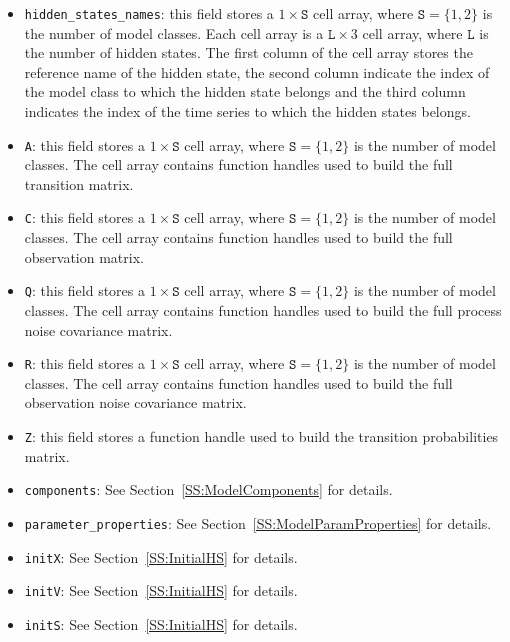\begin{itemize}
\item \lstinline[basicstyle = \mlttfamily \small ]!hidden_states_names!:  this field stores a $1\times \mathtt{S}$ cell array, where $\mathtt{S} = \{1,2 \}$ is the number of model classes.
Each cell array is a $ \mathtt{L} \times 3$ cell array, where $\mathtt{L}$ is the number of hidden states. The first column of the cell array stores the reference name of the hidden state, the second column indicate the index of the model class to which the hidden state belongs and the third column indicates the index of the time series to which the hidden states belongs.
\item \lstinline[basicstyle = \mlttfamily \small ]!A!:  this field stores a $1\times \mathtt{S}$ cell array, where $\mathtt{S} = \{1,2 \}$ is the number of model classes. The cell array contains function handles used to build the full transition matrix.
\item \lstinline[basicstyle = \mlttfamily \small ]!C!:  this field stores a $1\times \mathtt{S}$ cell array, where $\mathtt{S} = \{1,2 \}$ is the number of model classes. The cell array contains function handles used to build the full observation matrix.
\item \lstinline[basicstyle = \mlttfamily \small ]!Q!: this field stores a $1\times \mathtt{S}$ cell array, where $\mathtt{S} = \{1,2 \}$ is the number of model classes. The cell array contains function handles used to build the full process noise covariance matrix.
\item \lstinline[basicstyle = \mlttfamily \small ]!R!:  this field stores a $1\times \mathtt{S}$ cell array, where $\mathtt{S} = \{1,2 \}$ is the number of model classes. The cell array contains function handles used to build the full observation noise covariance matrix.
\item \lstinline[basicstyle = \mlttfamily \small ]!Z!:  this field stores a function handle used to build the transition probabilities matrix.
\item \lstinline[basicstyle = \mlttfamily \small ]!components!:   See Section~\ref{SS:ModelComponents} for details.
\item \lstinline[basicstyle = \mlttfamily \small ]!parameter_properties!: See Section~\ref{SS:ModelParamProperties} for details.
\item \lstinline[basicstyle = \mlttfamily \small ]!initX!: See Section~\ref{SS:InitialHS} for details.
\item \lstinline[basicstyle = \mlttfamily \small ]!initV!: See Section~\ref{SS:InitialHS} for details.
\item \lstinline[basicstyle = \mlttfamily \small ]!initS!: See Section~\ref{SS:InitialHS} for details.
\end{itemize}


